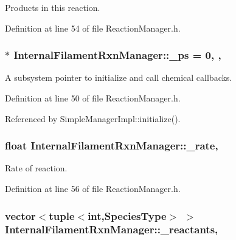 Products in this reaction. 



Definition at line 54 of file Reaction\+Manager.\+h.

\hypertarget{classInternalFilamentRxnManager_a973ce9cc2aae811e6867afa46193c5f2}{
\subsubsection[{\+\_\+ps}]{ $\ast$ Internal\+Filament\+Rxn\+Manager\+::\+\_\+ps = 0\hspace{0.3cm}{\ttfamily [static]}, {\ttfamily [protected]}, {\ttfamily [inherited]}}}\label{classInternalFilamentRxnManager_a973ce9cc2aae811e6867afa46193c5f2}


A subsystem pointer to initialize and call chemical callbacks. 



Definition at line 50 of file Reaction\+Manager.\+h.



Referenced by Simple\+Manager\+Impl\+::initialize().

\hypertarget{classInternalFilamentRxnManager_a8b98dd9e6f5d016149f5434b891806df}{
\subsubsection[{\+\_\+rate}]{\setlength{\rightskip}{0pt plus 5cm}float Internal\+Filament\+Rxn\+Manager\+::\+\_\+rate\hspace{0.3cm}{\ttfamily [protected]}, {\ttfamily [inherited]}}}\label{classInternalFilamentRxnManager_a8b98dd9e6f5d016149f5434b891806df}


Rate of reaction. 



Definition at line 56 of file Reaction\+Manager.\+h.

\hypertarget{classInternalFilamentRxnManager_a63de9061c3da4ad03cf4c530d2774979}{
\subsubsection[{\+\_\+reactants}]{\setlength{\rightskip}{0pt plus 5cm}vector$<$tuple$<$int,{\bf Species\+Type}$>$ $>$ Internal\+Filament\+Rxn\+Manager\+::\+\_\+reactants\hspace{0.3cm}{\ttfamily [protected]}, {\ttfamily [inherited]}}}\label{classInternalFilamentRxnManager_a63de9061c3da4ad03cf4c530d2774979}



